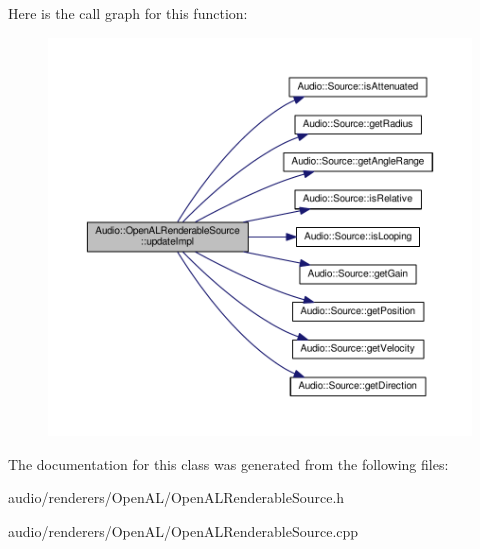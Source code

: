 Here is the call graph for this function\+:
\nopagebreak
\begin{figure}[H]
\begin{center}
\leavevmode
\includegraphics[width=350pt]{df/dc7/classAudio_1_1OpenALRenderableSource_a57503ddb02ef56fac0ca9830246aae31_cgraph}
\end{center}
\end{figure}




The documentation for this class was generated from the following files\+:\begin{DoxyCompactItemize}
\item 
audio/renderers/\+Open\+A\+L/Open\+A\+L\+Renderable\+Source.\+h\item 
audio/renderers/\+Open\+A\+L/Open\+A\+L\+Renderable\+Source.\+cpp\end{DoxyCompactItemize}
